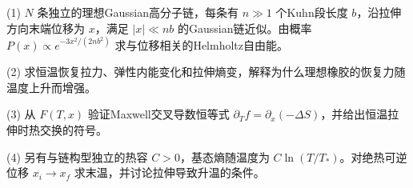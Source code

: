 (1) \(N\) 条独立的理想Gaussian高分子链，每条有 \(n\gg1\) 个Kuhn段长度 \(b\)，沿拉伸方向末端位移为 \(x\)，满足 \(|x|\ll nb\) 的Gaussian链近似。由概率 \(P(x)\propto e^{-3x^2/(2nb^2)}\) 求与位移相关的Helmholtz自由能。

(2) 求恒温恢复拉力、弹性内能变化和拉伸熵变，解释为什么理想橡胶的恢复力随温度上升而增强。

(3) 从 \(F(T,x)\) 验证Maxwell交叉导数恒等式 \(\partial_T f=\partial_x(-\Delta S)\)，并给出恒温拉伸时热交换的符号。

(4) 另有与链构型独立的热容 \(C>0\)，基态熵随温度为 \(C\ln(T/T_*)\)。对绝热可逆位移 \(x_i\to x_f\) 求末温，并讨论拉伸导致升温的条件。
